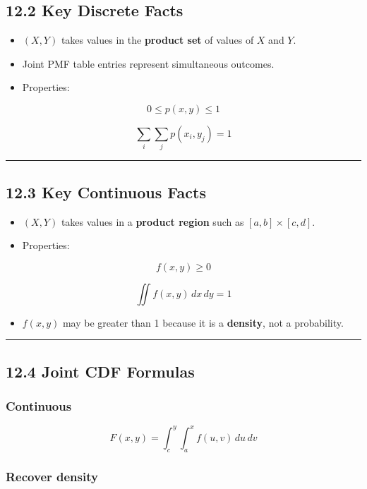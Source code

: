 \documentclass[12pt]{article}
\begin{document}
\subsection*{12.2 Key Discrete Facts}

\begin{itemize}
    \item \((X,Y)\) takes values in the \textbf{product set} of values of \(X\) and \(Y\).
    \item Joint PMF table entries represent simultaneous outcomes.
    \item Properties:
\end{itemize}

\[
0\le p(x,y)\le 1
\]

\[
\sum_i\sum_j p(x_i,y_j)=1
\]

\hrule
\vspace{1em}

\subsection*{12.3 Key Continuous Facts}

\begin{itemize}
    \item \((X,Y)\) takes values in a \textbf{product region} such as \([a,b]\times[c,d]\).
    \item Properties:
\end{itemize}

\[
f(x,y)\ge 0
\]

\[
\iint f(x,y)\,dx\,dy=1
\]

\begin{itemize}
    \item \(f(x,y)\) may be greater than 1 because it is a \textbf{density}, not a probability.
\end{itemize}

\hrule
\vspace{1em}

\subsection*{12.4 Joint CDF Formulas}

\subsubsection*{Continuous}

\[
F(x,y)=\int_c^y\int_a^x f(u,v)\,du\,dv
\]

\subsubsection*{Recover density}
\end{document}

